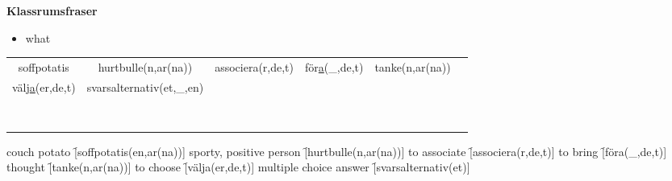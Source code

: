 
\begin{flushleft}
    \textbf{Klassrumsfraser}
    \begin{itemize}
        \item what
    \end{itemize}
\end{flushleft}

\begin{center}
    \begin{tabular}{|c c c c c c|}
        \hline
        soffpotatis & hurtbulle(n,ar(na)) & associera(r,de,t) & för\underline{a}(\_,de,t) & tanke(n,ar(na)) & \\
        välj\underline{a}(er,de,t) & svarsalternativ(et,\_,en) &  &  &  & \\
         &  &  &  &  & \\
         &  &  &  &  & \\
         &  &  &  &  & \\
         &  &  &  &  & \\
         &  &  &  &  & \\
         &  &  &  &  & \\
         &  &  &  &  & \\
         &  &  &  &  & \\
        \hline
    \end{tabular}
\end{center}

\begin{questions}
    \begin{multicols}{2}
        \raggedcolumns
        \question couch potato \f[soffpotatis(en,ar(na))]
        \question sporty, positive person \f[hurtbulle(n,ar(na))]
        \question to associate \f[associera(r,de,t)]
        \question to bring \f[föra(\_,de,t)]
        \question thought \f[tanke(n,ar(na))]
        \question to choose \f[välja(er,de,t)]
        \question multiple choice answer \f[svarsalternativ(et)]
    \end{multicols}
\end{questions}

